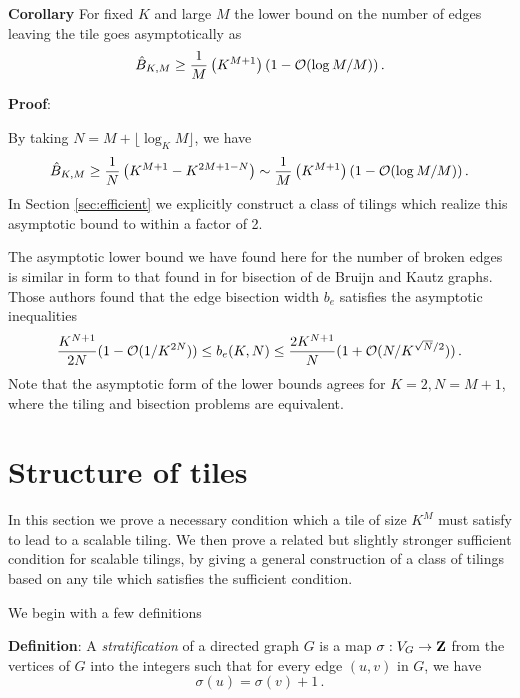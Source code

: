 \documentclass[12pt]{article}
\begin{document}
\noindent
{\bf Corollary}
For fixed $K$ and large $M$ the lower bound on
the number of edges leaving the tile goes asymptotically as
\begin{equation}
\hat{B}_{K, M} \geq
\frac{1}{M} \left( K^{M + 1} \right)
(1 - {\cal O} (\log M/M)) \,.
\label{eq:lower-bound}
\end{equation}

\vspace*{0.1in}
\noindent
{\bf Proof}:

By taking $N = M +\lfloor \log_K M \rfloor$, we have
\begin{equation}
\hat{B}_{K, M} \geq
\frac{1}{N} \left( K^{M + 1} -K^{2M + 1-N} \right)
\sim
\frac{1}{M} \left( K^{M + 1} \right)
(1 - {\cal O} (\log M/M)) \,.
\end{equation}
In Section \ref{sec:efficient} we explicitly construct a class of
tilings which realize this asymptotic bound to within a factor of 2.

The asymptotic lower bound we have found here for the number of broken
edges is similar in form to that found in \cite{rttv} for  bisection of
de Bruijn and Kautz graphs.  Those authors found that the edge
bisection width $b_e$ satisfies the asymptotic inequalities
\begin{equation}
\frac{K^{N + 1}}{2 N}  
(1-{\cal O} (1/K^{2 N})) \leq b_e (K, N)
\leq
\frac{2 K^{N + 1}}{N}  
(1+{\cal O} (N/K^{ \sqrt{N}/2})) \,.
 \label{eq:bisection-bounds}
\end{equation}
Note that the asymptotic form of the lower bounds agrees for $K = 2, N
= M + 1$, where the tiling and bisection problems are equivalent.



\section{Structure  of  tiles}

In this section we prove a necessary condition which a tile of size
$K^M$ must satisfy to lead to a scalable tiling.  We then prove a
related but slightly stronger sufficient condition for scalable
tilings, by giving a general construction of a class of tilings based
on any tile which satisfies the sufficient condition.

We begin with a few definitions

\vspace*{0.1in}
\noindent
{\bf Definition}: A  {\it stratification} of a directed
graph $G$ is a map
$\sigma:V_G \rightarrow {\bf Z}$ from the vertices of $G$ into the
integers such that for every edge $(u, v)$ in $G$, we have
\begin{equation}
\sigma (u) = \sigma (v) + 1 \,.
\label{eq:stratification-rule}
\end{equation}
\end{document}
